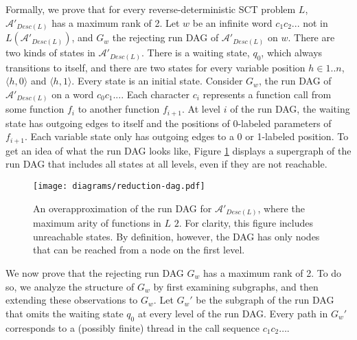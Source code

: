 \documentclass{LMCS}
\newcommand{\zug}[1]{\langle #1  \rangle}
\newcommand{\A}{{\mathcal A}}
\begin{document}
Formally, we prove that for every reverse-deterministic SCT problem $L$, $\A'_{Desc(L)}$ has a
maximum rank of 2. Let $w$ be an infinite word $c_1c_2...$ not in $L(\A'_{Desc(L)})$, and $G_w$ the
rejecting run DAG of $\A'_{Desc(L)}$ on $w$.  There are two kinds of states in $\A'_{Desc(L)}$.
There is a waiting state, $q_0$, which always transitions to itself, and there are two states for
every variable position $h \in 1..n$, $\zug{h,0}$ and $\zug{h,1}$. Every state is an initial state.
Consider $G_w$, the run DAG of $\A'_{Desc(L)}$ on a word $c_0c_1...$.  Each character $c_i$
represents a function call from some function $f_i$ to another function $f_{i+1}$. At level $i$ of
the run DAG, the waiting state has outgoing edges to itself and the positions of 0-labeled
parameters of $f_{i+1}$. Each variable state only has outgoing edges to a 0 or 1-labeled position.
To get an idea of what the run DAG looks like, Figure \ref{fig:Dag_Rank_2} displays a supergraph of
the run DAG that includes all states at all levels, even if they are not reachable.

\begin{figure}[tb]
\begin{center}
\texttt{[image: diagrams/reduction-dag.pdf]}
\end{center}
\caption{An overapproximation of the run DAG for $\A'_{Desc(L)}$, where the maximum arity of
functions in $L$ $2$. For clarity, this figure includes unreachable states.  By definition, however,
the DAG has only nodes that can be reached from a node on the first level.  }\label{fig:Dag_Rank_2}
\end{figure}


We now prove that the rejecting run DAG $G_w$ has a maximum rank of 2. To do so, we analyze the
structure of $G_w$ by first examining subgraphs, and then extending these observations to $G_w$. Let
$G_w'$ be the subgraph of the run DAG that omits the waiting state $q_0$ at every level of the run
DAG. Every path in $G_w'$ corresponds to a (possibly finite) thread in the call sequence
$c_1c_2\ldots$. 
\end{document}
